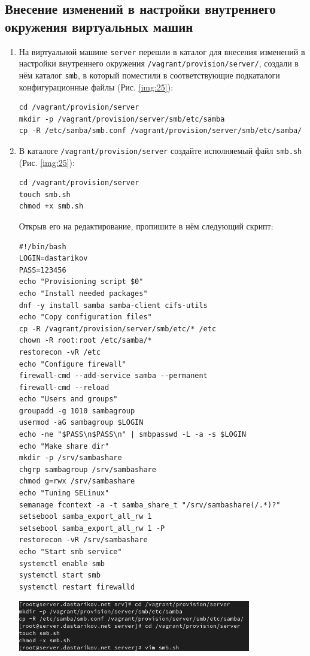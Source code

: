 \subsection{Внесение изменений в настройки внутреннего окружения виртуальных машин}
\begin{enumerate}
\item На виртуальной машине {\tt server} перешли в каталог для внесения изменений в настройки внутреннего окружения {\tt /vagrant/provision/server/}, создали в нём каталог {\tt smb}, в который поместили в соответствующие подкаталоги конфигурационные файлы (Рис. \ref{img:25}):
    \begin{verbatim}
cd /vagrant/provision/server
mkdir -p /vagrant/provision/server/smb/etc/samba
cp -R /etc/samba/smb.conf /vagrant/provision/server/smb/etc/samba/
    \end{verbatim}
\item В каталоге {\tt /vagrant/provision/server} создайте исполняемый файл {\tt smb.sh} (Рис. \ref{img:25}):
    \begin{verbatim}
cd /vagrant/provision/server
touch smb.sh
chmod +x smb.sh
    \end{verbatim}
Открыв его на редактирование, пропишите в нём следующий скрипт:
    \begin{verbatim}
#!/bin/bash
LOGIN=dastarikov
PASS=123456
echo "Provisioning script $0"
echo "Install needed packages"
dnf -y install samba samba-client cifs-utils
echo "Copy configuration files"
cp -R /vagrant/provision/server/smb/etc/* /etc
chown -R root:root /etc/samba/*
restorecon -vR /etc
echo "Configure firewall"
firewall-cmd --add-service samba --permanent
firewall-cmd --reload
echo "Users and groups"
groupadd -g 1010 sambagroup
usermod -aG sambagroup $LOGIN
echo -ne "$PASS\n$PASS\n" | smbpasswd -L -a -s $LOGIN
echo "Make share dir"
mkdir -p /srv/sambashare
chgrp sambagroup /srv/sambashare
chmod g=rwx /srv/sambashare
echo "Tuning SELinux"
semanage fcontext -a -t samba_share_t "/srv/sambashare(/.*)?"
setsebool samba_export_all_rw 1
setsebool samba_export_all_rw 1 -P
restorecon -vR /srv/sambashare
echo "Start smb service"
systemctl enable smb
systemctl start smb
systemctl restart firewalld
    \end{verbatim}

\begin{center}
    \centering
    \includegraphics[width=0.8\textwidth]{../images/image25.png}
    \label{img:25}
\end{center}


\end{enumerate}
